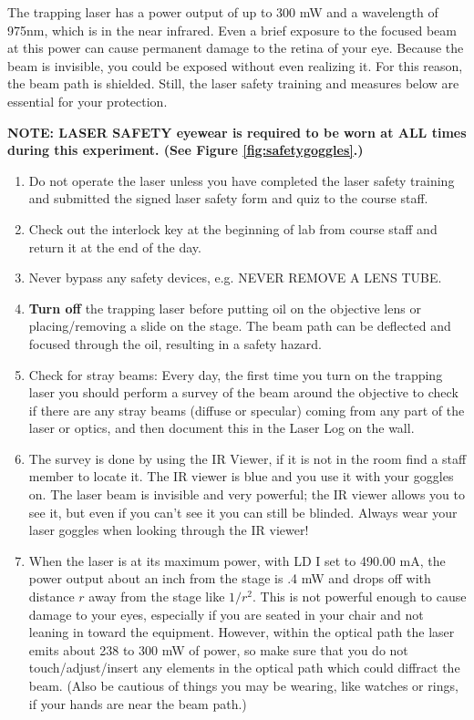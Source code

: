 \documentclass{../lab}
\begin{document}
The trapping laser has a power output of up to 300 mW and a wavelength of 975nm, which is in the near infrared. Even a brief exposure to the focused beam at this power can cause permanent damage to the retina of your eye. Because the beam is invisible, you could be exposed without even realizing it. For this reason, the beam path is shielded. Still, the laser safety training and measures below are essential for your protection.

\textbf{NOTE: LASER  SAFETY eyewear is required to be worn at ALL times during this experiment. (See Figure \ref{fig:safetygoggles}.)}

\begin{enumerate}
    \item Do not operate the laser unless you have completed the laser safety training and submitted the signed laser safety form and quiz to the course staff. 
    
    \item Check out the interlock key at the beginning of lab from course staff and return it at the end of the day.

    \item Never bypass any safety devices, e.g. NEVER REMOVE A LENS TUBE.

    \item \textbf{Turn off} the trapping laser before putting oil on the objective lens or placing/removing a slide on the stage. The beam path can be deflected and focused through the oil, resulting in a safety hazard.

    \item Check for stray beams: Every day, the first time you turn on the trapping laser you should perform a survey of the beam around the objective to check if there are any stray beams (diffuse or specular) coming from any part of the laser or optics, and then document this in the Laser Log on the wall.

    \item The survey is done by using the IR Viewer, if it is not in the room find a staff member to locate it. The IR viewer is blue and you use it with your goggles on. The laser beam is invisible and very powerful; the IR viewer allows you to see it, but even if you can't see it you can still be blinded. Always wear your laser goggles when looking through the IR viewer!

    \item When the laser is at its maximum power, with LD I set to 490.00 mA, the power output about an inch from the stage is .4 mW and drops off with distance $r$ away from the stage like $1/r^2$. This is not powerful enough to cause damage to your eyes, especially if you are seated in your chair and not leaning in toward the equipment. However, within the optical path the laser emits about 238 to 300 mW of power, so make sure that you do not touch/adjust/insert any elements in the optical path which could diffract the beam. (Also be cautious of things you may be wearing, like watches or rings, if your hands are near the beam path.)

\end{enumerate}
\end{document}
